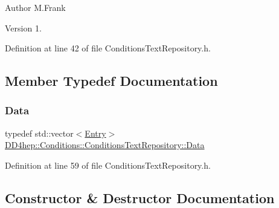 \begin{DoxyAuthor}{Author}
M.\+Frank 
\end{DoxyAuthor}
\begin{DoxyVersion}{Version}
1. 
\end{DoxyVersion}


Definition at line 42 of file Conditions\+Text\+Repository.\+h.



\subsection{Member Typedef Documentation}
\hypertarget{class_d_d4hep_1_1_conditions_1_1_conditions_text_repository_afe5d8989bf0bcd711e59f838943b5115}{}\label{class_d_d4hep_1_1_conditions_1_1_conditions_text_repository_afe5d8989bf0bcd711e59f838943b5115} 
\subsubsection{\texorpdfstring{Data}{Data}}
{\footnotesize\ttfamily typedef std\+::vector$<$\hyperlink{class_d_d4hep_1_1_conditions_1_1_conditions_text_repository_1_1_entry}{Entry}$>$ \hyperlink{class_d_d4hep_1_1_conditions_1_1_conditions_text_repository_afe5d8989bf0bcd711e59f838943b5115}{D\+D4hep\+::\+Conditions\+::\+Conditions\+Text\+Repository\+::\+Data}}



Definition at line 59 of file Conditions\+Text\+Repository.\+h.



\subsection{Constructor \& Destructor Documentation}
\hypertarget{class_d_d4hep_1_1_conditions_1_1_conditions_text_repository_ae00798ba3a2736978fc0b9c3a9325abe}{}\label{class_d_d4hep_1_1_conditions_1_1_conditions_text_repository_ae00798ba3a2736978fc0b9c3a9325abe} 
